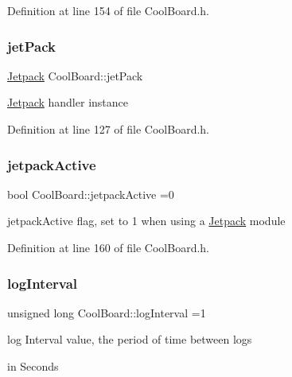 Definition at line 154 of file Cool\+Board.\+h.

\mbox{\label{class_cool_board_a30b1357881b01ccbec676856a91e48e9}} 
\subsubsection{\texorpdfstring{jet\+Pack}{jetPack}}
{\footnotesize\ttfamily \hyperlink{class_jetpack}{Jetpack} Cool\+Board\+::jet\+Pack\hspace{0.3cm}{\ttfamily [private]}}

\hyperlink{class_jetpack}{Jetpack} handler instance 

Definition at line 127 of file Cool\+Board.\+h.

\mbox{\label{class_cool_board_a9be03a913d26e558328935ca3b59a75e}} 
\subsubsection{\texorpdfstring{jetpack\+Active}{jetpackActive}}
{\footnotesize\ttfamily bool Cool\+Board\+::jetpack\+Active =0\hspace{0.3cm}{\ttfamily [private]}}

jetpack\+Active flag, set to 1 when using a \hyperlink{class_jetpack}{Jetpack} module 

Definition at line 160 of file Cool\+Board.\+h.

\mbox{\label{class_cool_board_a84bc94413b64973e4aba8c467c97006c}} 
\subsubsection{\texorpdfstring{log\+Interval}{logInterval}}
{\footnotesize\ttfamily unsigned long Cool\+Board\+::log\+Interval =1\hspace{0.3cm}{\ttfamily [private]}}

log Interval value, the period of time between logs
\begin{DoxyItemize}
\item in Seconds 
\end{DoxyItemize}


